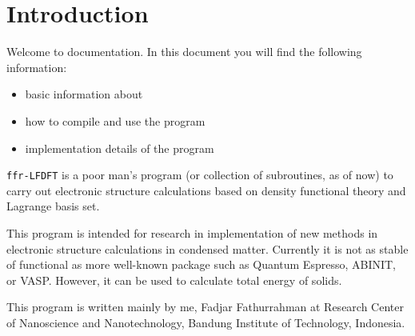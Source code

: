\section{Introduction}

Welcome to \ffrLFDFT documentation.
In this document you will find the following information:
\begin{itemize}
\item basic information about \ffrLFDFT
\item how to compile and use the program
\item implementation details of the program
\end{itemize}

{\tt ffr-LFDFT} is a poor man's program (or collection of subroutines, as of now)
to carry out electronic structure calculations based on density functional theory
and Lagrange basis set.

This program is intended for research in implementation of new methods in
electronic structure calculations in condensed matter.
Currently it is not as stable of functional
as more well-known package such as Quantum Espresso, ABINIT, or VASP.
However, it can be used to calculate total energy of solids.

This program is written mainly by me, Fadjar Fathurrahman at Research Center
of Nanoscience and Nanotechnology, Bandung Institute of Technology, Indonesia.


